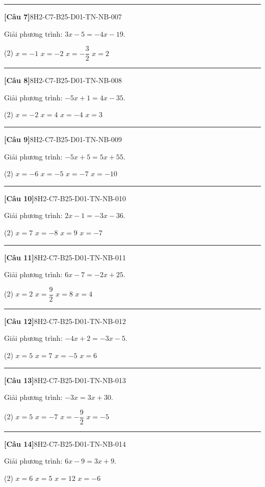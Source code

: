 \documentclass[12pt,a4paper]{article}
\newif\ifloigiai
\newenvironment{cauhoi}[2]{%
  \par\medskip\noindent\rule{\textwidth}{0.4pt}\par\nopagebreak
  \noindent\textbf{[#1]}\hfill{\scriptsize\ttfamily #2}\par\nopagebreak\smallskip}{\par}
\newcommand{\dapan}[1]{\ifloigiai\par\smallskip\noindent\textit{Đáp án:} \textbf{#1}\par\fi}
\begin{document}
\begin{cauhoi}{Câu 7}{8H2-C7-B25-D01-TN-NB-007}
Giải phương trình: $3x - 5=-4x - 19$.
\begin{tasks}(2)
\task $x=-1$
\task $x=-2$
\task $x=-\dfrac{3}{2}$
\task $x=2$
\end{tasks}
\dapan{B}
\end{cauhoi}
\begin{cauhoi}{Câu 8}{8H2-C7-B25-D01-TN-NB-008}
Giải phương trình: $-5x + 1=4x - 35$.
\begin{tasks}(2)
\task $x=-2$
\task $x=4$
\task $x=-4$
\task $x=3$
\end{tasks}
\dapan{B}
\end{cauhoi}
\begin{cauhoi}{Câu 9}{8H2-C7-B25-D01-TN-NB-009}
Giải phương trình: $-5x + 5=5x + 55$.
\begin{tasks}(2)
\task $x=-6$
\task $x=-5$
\task $x=-7$
\task $x=-10$
\end{tasks}
\dapan{B}
\end{cauhoi}
\begin{cauhoi}{Câu 10}{8H2-C7-B25-D01-TN-NB-010}
Giải phương trình: $2x - 1=-3x - 36$.
\begin{tasks}(2)
\task $x=7$
\task $x=-8$
\task $x=9$
\task $x=-7$
\end{tasks}
\dapan{D}
\end{cauhoi}
\begin{cauhoi}{Câu 11}{8H2-C7-B25-D01-TN-NB-011}
Giải phương trình: $6x - 7=-2x + 25$.
\begin{tasks}(2)
\task $x=2$
\task $x=\dfrac{9}{2}$
\task $x=8$
\task $x=4$
\end{tasks}
\dapan{D}
\end{cauhoi}
\begin{cauhoi}{Câu 12}{8H2-C7-B25-D01-TN-NB-012}
Giải phương trình: $-4x + 2=-3x - 5$.
\begin{tasks}(2)
\task $x=5$
\task $x=7$
\task $x=-5$
\task $x=6$
\end{tasks}
\dapan{B}
\end{cauhoi}
\begin{cauhoi}{Câu 13}{8H2-C7-B25-D01-TN-NB-013}
Giải phương trình: $-3x=3x + 30$.
\begin{tasks}(2)
\task $x=5$
\task $x=-7$
\task $x=-\dfrac{9}{2}$
\task $x=-5$
\end{tasks}
\dapan{D}
\end{cauhoi}
\begin{cauhoi}{Câu 14}{8H2-C7-B25-D01-TN-NB-014}
Giải phương trình: $6x - 9=3x + 9$.
\begin{tasks}(2)
\task $x=6$
\task $x=5$
\task $x=12$
\task $x=-6$
\end{tasks}
\dapan{A}
\end{cauhoi}
\end{document}
